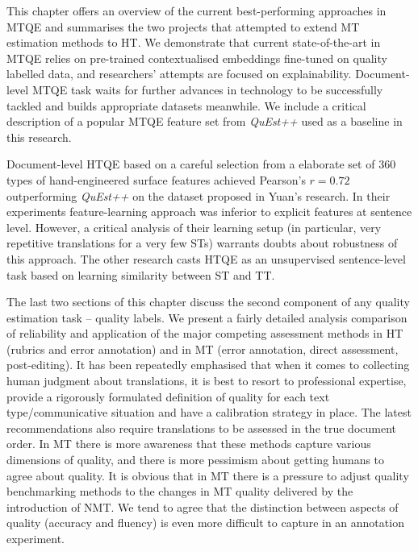 This chapter offers an overview of the current best-performing approaches in MTQE and summarises the two projects that attempted to extend MT estimation methods to HT. We demonstrate that current state-of-the-art in MTQE relies on pre-trained contextualised embeddings fine-tuned on quality labelled data, and researchers' attempts are focused on explainability. Document-level MTQE task waits for further advances in technology to be successfully tackled and builds appropriate datasets meanwhile. 
We include a critical description of a popular MTQE feature set from \textit{QuEst++} used as a baseline in this research.  

Document-level HTQE based on a careful selection from a elaborate set of 360 types of hand-engineered surface features achieved Pearson's $r=0.72$ outperforming \textit{QuEst++} on the dataset proposed in Yuan's \citeyear{Yuan2018} research. In their experiments feature-learning approach was inferior to explicit features at sentence level. However, a critical analysis of their learning setup (in particular, very repetitive translations for a very few STs) warrants doubts about robustness of this approach.
The other research casts HTQE as an unsupervised sentence-level task based on learning similarity between ST and TT.
 
The last two sections of this chapter discuss the second component of any quality estimation task -- quality labels. 
We present a fairly detailed analysis comparison of reliability and application of the major competing assessment methods in HT (rubrics and error annotation) and in MT (error annotation, direct assessment, post-editing). It has been repeatedly emphasised that when it comes to collecting human judgment about translations, it is best to resort to professional expertise, provide a rigorously formulated definition of quality for each text type/communicative situation and have a calibration strategy in place. The latest recommendations also require translations to be assessed in the true document order.
In MT there is more awareness that these methods capture various dimensions of quality, and there is more pessimism about getting humans to agree about quality. It is obvious that in MT there is a pressure to adjust quality benchmarking methods to the changes in MT quality delivered by the introduction of NMT. 
We tend to agree that the distinction between aspects of quality (accuracy and fluency) is even more difficult to capture in an annotation experiment. 

